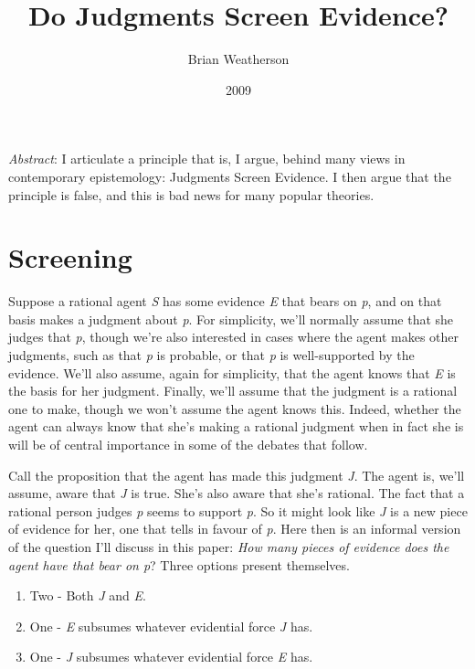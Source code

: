 \documentclass[
  11pt,
  letterpaper,
  DIV=11,
  numbers=noendperiod,
  twoside]{scrartcl}
\title{Do Judgments Screen Evidence?}
\author{Brian Weatherson}
\date{2009}
\providecommand{\tightlist}{%
  \setlength{\itemsep}{0pt}\setlength{\parskip}{0pt}}
\renewenvironment{abstract}
 {\vspace{-1.25cm}
 \quotation\small\noindent\emph{Abstract}:}
 {\endquotation}
\renewenvironment{abstract}
 {\quotation\small\noindent\emph{Abstract}:}
 {\endquotation\vspace{-0.02cm}}
\begin{document}
\maketitle
\begin{abstract}
I articulate a principle that is, I argue, behind many views in
contemporary epistemology: Judgments Screen Evidence. I then argue that
the principle is false, and this is bad news for many popular theories.
\end{abstract}


\section{Screening}\label{screening}

Suppose a rational agent \emph{S} has some evidence \emph{E} that bears
on \emph{p}, and on that basis makes a judgment about \emph{p}. For
simplicity, we'll normally assume that she judges that \emph{p}, though
we're also interested in cases where the agent makes other judgments,
such as that \emph{p} is probable, or that \emph{p} is well-supported by
the evidence. We'll also assume, again for simplicity, that the agent
knows that \emph{E} is the basis for her judgment. Finally, we'll assume
that the judgment is a rational one to make, though we won't assume the
agent knows this. Indeed, whether the agent can always know that she's
making a rational judgment when in fact she is will be of central
importance in some of the debates that follow.

Call the proposition that the agent has made this judgment \emph{J}. The
agent is, we'll assume, aware that \emph{J} is true. She's also aware
that she's rational. The fact that a rational person judges \emph{p}
seems to support \emph{p}. So it might look like \emph{J} is a new piece
of evidence for her, one that tells in favour of \emph{p}. Here then is
an informal version of the question I'll discuss in this paper:
\emph{How many pieces of evidence does the agent have that bear on p}?
Three options present themselves.

\begin{enumerate}
\def\labelenumi{\arabic{enumi}.}
\tightlist
\item
  Two - Both \emph{J} and \emph{E}.
\item
  One - \emph{E} subsumes whatever evidential force \emph{J} has.
\item
  One - \emph{J} subsumes whatever evidential force \emph{E} has.
\end{enumerate}
\end{document}
